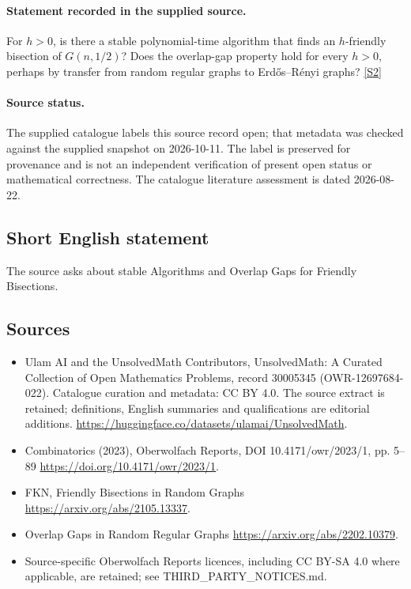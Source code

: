 \documentclass[11pt]{article}
\begin{document}
\paragraph{Statement recorded in the supplied source.}
For $h>0$, is there a stable polynomial-time algorithm that finds an $h$-friendly bisection of $G(n,1/2)$? Does the overlap-gap property hold for every $h>0$, perhaps by transfer from random regular graphs to Erdős–Rényi graphs? \href{https://doi.org/10.4171/owr/2023/1}{[S2]}
\paragraph{Source status.}
The supplied catalogue labels this source record open; that metadata was checked against the supplied snapshot on 2026-10-11. The label is preserved for provenance and is not an independent verification of present open status or mathematical correctness. The catalogue literature assessment is dated 2026-08-22.
\subsection{Short English statement}
The source asks about stable Algorithms and Overlap Gaps for Friendly Bisections.
\subsection{Sources}
\begin{itemize}
\item[S1] Ulam AI and the UnsolvedMath Contributors, UnsolvedMath: A Curated Collection of Open Mathematics Problems, record 30005345 (OWR-12697684-022). Catalogue curation and metadata: CC BY 4.0. The source extract is retained; definitions, English summaries and qualifications are editorial additions.
\url{https://huggingface.co/datasets/ulamai/UnsolvedMath}.
\item[S2] Combinatorics (2023), Oberwolfach Reports, DOI 10.4171/owr/2023/1, pp. 5--89
\url{https://doi.org/10.4171/owr/2023/1}.
\item[S3] FKN, Friendly Bisections in Random Graphs
\url{https://arxiv.org/abs/2105.13337}.
\item[S4] Overlap Gaps in Random Regular Graphs
\url{https://arxiv.org/abs/2202.10379}.
\item Source-specific Oberwolfach Reports licences, including CC BY-SA 4.0 where applicable, are retained; see THIRD\_PARTY\_NOTICES.md.
\end{itemize}
\end{document}
